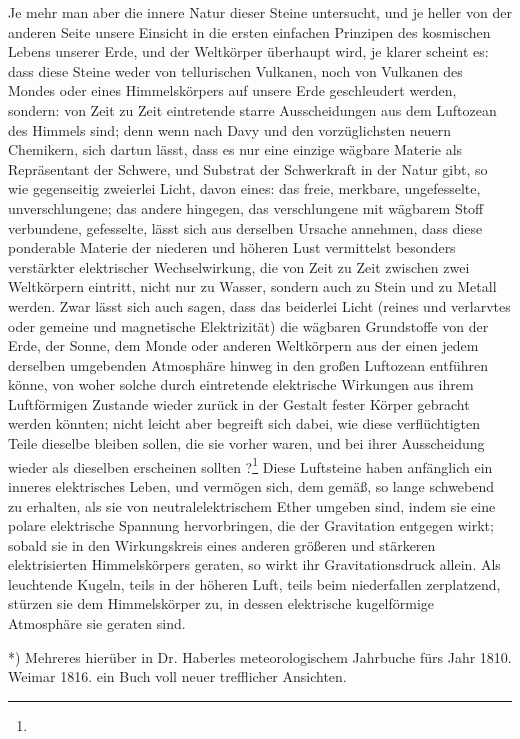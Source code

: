 \documentclass[a4paper, 11pt, oneside, polutonikogreek, german]{article}
\begin{document}
Je mehr man aber die innere Natur dieser Steine untersucht, und je heller von der anderen Seite unsere Einsicht in die ersten einfachen Prinzipen des kosmischen Lebens unserer Erde, und der Weltkörper überhaupt wird, je klarer scheint es: dass diese Steine weder von tellurischen Vulkanen, noch von Vulkanen des Mondes oder eines Himmelskörpers auf unsere Erde geschleudert werden, sondern: von Zeit zu Zeit eintretende starre Ausscheidungen aus dem Luftozean des Himmels sind; denn wenn nach Davy und den vorzüglichsten neuern Chemikern, sich dartun lässt, dass es nur eine einzige wägbare Materie als Repräsentant der Schwere, und Substrat der Schwerkraft in der Natur gibt, so wie gegenseitig zweierlei Licht, davon eines: das freie, merkbare, ungefesselte, unverschlungene; das andere hingegen, das verschlungene mit wägbarem Stoff verbundene, gefesselte, lässt sich aus derselben Ursache annehmen, dass diese ponderable Materie der niederen und höheren Lust vermittelst besonders verstärkter elektrischer Wechselwirkung, die von Zeit zu Zeit zwischen zwei Weltkörpern eintritt, nicht nur zu Wasser, sondern auch zu Stein und zu Metall werden. Zwar lässt sich auch sagen, dass das beiderlei Licht (reines und verlarvtes oder gemeine und magnetische Elektrizität) die wägbaren Grundstoffe von der Erde, der Sonne, dem Monde oder anderen Weltkörpern aus der einen jedem derselben umgebenden Atmosphäre hinweg in den großen Luftozean entführen könne, von woher solche durch eintretende elektrische Wirkungen aus ihrem Luftförmigen Zustande wieder zurück in der Gestalt fester Körper gebracht werden könnten; nicht leicht aber begreift sich dabei, wie diese verflüchtigten Teile dieselbe bleiben sollen, die sie vorher waren, und bei ihrer Ausscheidung wieder als dieselben erscheinen sollten ?\footnote{} Diese Luftsteine haben anfänglich ein inneres elektrisches Leben, und vermögen sich, dem gemäß, so lange schwebend zu erhalten, als sie von neutralelektrischem Ether umgeben sind, indem sie eine polare elektrische Spannung hervorbringen, die der Gravitation entgegen wirkt; sobald sie in den Wirkungskreis eines anderen größeren und stärkeren elektrisierten Himmelskörpers geraten, so wirkt ihr Gravitationsdruck allein. Als leuchtende Kugeln, teils in der höheren Luft, teils beim niederfallen zerplatzend, stürzen sie dem Himmelskörper zu, in dessen elektrische kugelförmige Atmosphäre sie geraten sind.

*) Mehreres hierüber in Dr. Haberles meteorologischem Jahrbuche fürs Jahr 1810. Weimar 1816. ein Buch voll neuer trefflicher Ansichten.
\end{document}

